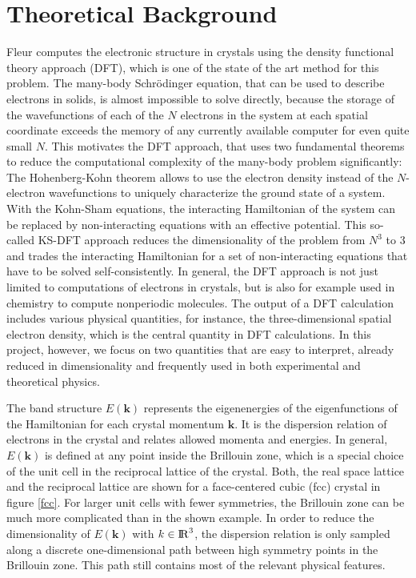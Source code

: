 
\chapter{Theoretical Background}
\label{chap:theory}



Fleur computes the electronic structure in crystals using the density functional theory approach (DFT), which is one of the state of the art method for this problem. The many-body Schrödinger equation, that can be used to describe electrons in solids, is almost impossible to solve directly, because the storage of the wavefunctions of each of the $N$ electrons in the system at each spatial coordinate exceeds the memory of any currently available computer for even quite small $N$. This motivates the DFT approach, that uses two fundamental theorems to reduce the computational complexity of the many-body problem significantly: The Hohenberg-Kohn theorem allows to use the electron density instead of the $N$-electron wavefunctions to uniquely characterize the ground state of a system. With the Kohn-Sham equations, the interacting Hamiltonian of the system can be replaced by non-interacting equations with an effective potential. This so-called KS-DFT approach reduces the dimensionality of the problem from $N^3$ to $3$ and trades the interacting Hamiltonian for a set of non-interacting equations that have to be solved self-consistently. In general, the DFT approach is not just limited to computations of electrons in crystals, but is also for example used in chemistry to compute nonperiodic molecules.
% 
The output of a DFT calculation includes various physical quantities, for instance, the three-dimensional spatial electron density, which is the central quantity in DFT calculations. In this project, however, we focus on two quantities that are easy to interpret, already reduced in dimensionality and frequently used in both experimental and theoretical physics.

The band structure $E(\mathbf{k})$ represents the eigenenergies of the eigenfunctions of the Hamiltonian for each crystal momentum $\mathbf{k}$. It is the dispersion relation of electrons in the crystal and relates allowed momenta and energies. In general, $E(\mathbf{k})$ is defined at any point inside the Brillouin zone, which is a special choice of the unit cell in the reciprocal lattice of the crystal. Both, the real space lattice and the reciprocal lattice are shown for a face-centered cubic (fcc) crystal in figure \ref{fcc}. For larger unit cells with fewer symmetries, the Brillouin zone can be much more complicated than in the shown example. In order to reduce the dimensionality of $E(\mathbf{k})$ with $k \in {\rm I\!R}^3$, the dispersion relation is only sampled along a discrete one-dimensional path between high symmetry points in the Brillouin zone. This path still contains most of the relevant physical features.


